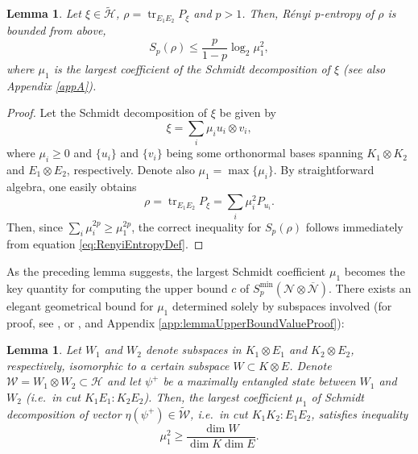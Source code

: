 \documentclass[reqno]{amsart}
\theoremstyle{plain}
\newtheorem{lemma}[theorem]{Lemma}
\theoremstyle{note}
\newcommand{\ptr}[2]{\operatorname{tr}_{#1}{#2}}
\newcommand{\proj}[1]{P_{#1}}
\begin{document}
\begin{lemma}\label{lemma:MinimalOutEntropyUpperBound}
Let $\xi \in \tilde{\mathcal{H}}$, $\rho = \ptr{E_1 E_2}{\proj{\xi}}$ and $p>1$. Then, R\'{e}nyi \textit{p}-entropy of $\rho$ is bounded from above,
\begin{equation}
    S_{p}(\rho) \leqslant \frac{p}{1-p} \log_2 {\mu_{1}^{2}},
\end{equation}
where $\mu_1$ is the largest coefficient of the Schmidt decomposition of $\xi$ (see also Appendix \ref{appA}).
\end{lemma}

\begin{proof}
Let the Schmidt decomposition of $\xi$ be given by
\begin{equation}
    \xi = \sum_{i} \mu_i u_i \otimes v_i ,
\end{equation}
where $\mu_i \geqslant 0$ and $\{u_i\}$ and $\{v_i\}$ being some orthonormal bases spanning $K_1 \otimes K_2$ and $E_1 \otimes E_2$, respectively. Denote also $\mu_1 = \max{\{\mu_i\}}$. By straightforward algebra, one easily obtains
\begin{equation}\label{eq:rhoReducedcutK12E12}
    \rho = \ptr{E_1 E_2}{\proj{\xi}} = \sum_{i} \mu_{i}^{2} \proj{u_i}.
\end{equation}
Then, since $\sum_i \mu_{i}^{2p} \geqslant \mu_{1}^{2p}$, the correct inequality for $S_p (\rho)$ follows immediately from equation \eqref{eq:RenyiEntropyDef}.
\end{proof}

As the preceding lemma suggests, the largest Schmidt coefficient $\mu_1$ becomes the key quantity for computing the upper bound $c$ of $S_{p}^{\mathrm{min}}(\mathcal{N}\otimes\overline{\mathcal{N}})$. There exists an elegant geometrical bound for $\mu_1$ determined solely by subspaces involved (for proof, see \cite[Lemma 8.7]{Aubrun_Szarek_2017}, or \cite[Lemma 3.3]{Hayden2008}, and Appendix \ref{app:lemmaUpperBoundValueProof}):

\begin{lemma}\label{lemma:UpperBoundValue}
Let $W_1$ and $W_2$ denote subspaces in $K_1 \otimes E_1$ and $K_2 \otimes E_2$, respectively, isomorphic to a certain subspace $W \subset K \otimes E$. Denote $\mathcal{W} = W_1 \otimes W_2 \subset \mathcal{H}$ and let $\psi^+$ be a maximally entangled state between $W_1$ and $W_2$ (i.e.~in cut $K_1 E_1 : K_2 E_2$). Then, the largest coefficient $\mu_1$ of Schmidt decomposition of vector $\eta (\psi^+) \in \tilde{\mathcal{W}}$, i.e.~in cut $K_1 K_2 : E_1 E_2$, satisfies inequality
\begin{equation}
    \mu_{1}^{2} \geqslant \frac{\dim{W}}{\dim{K}\dim{E}} .
\end{equation}
\end{lemma}
\end{document}
